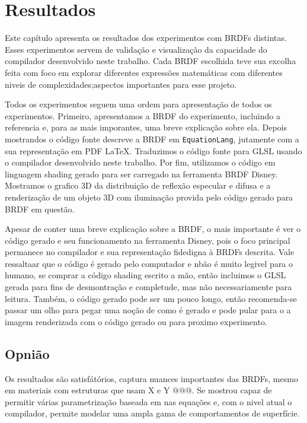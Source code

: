 \chapter{Resultados}
\label{chapter.resultados}


Este capítulo apresenta os resultados dos experimentos com BRDFs distintas. Esses experimentos servem de validação e visualização da capacidade do compilador desenvolvido neste trabalho. Cada BRDF escolhida teve sua excolha feita com foco em explorar diferentes expressões matemáticas com diferentes niveis de complexidades;aspectos importantes para esse projeto.

Todos os experimentos seguem uma ordem para apresentação de todos os experimentos. Primeiro, apresentamos a BRDF do experimento, incluindo a referencia e, para as mais imporantes, uma breve explicação sobre ela. Depois mostrandos o código fonte descreve a BRDF em \texttt{EquationLang}, jutamente com a sua representação em PDF \LaTeX. Traduzimos o código fonte para GLSL usando o compilador desenvolvido neste trabalho. Por fim, utilizamos o código em linguagem shading gerado para ser carregado na ferramenta BRDF Disney. Mostramos o grafico 3D da distribuição de reflexão especular e difusa e a renderização de um objeto 3D com iluminação provida pelo código gerado para BRDF em questão.

Apesar de conter uma breve explicação sobre a BRDF, o mais importante é ver o código gerado e seu funcionamento na ferramenta Disney, pois o foco principal permanece no compilador e sua representação fidedigna à BRDFs descrita.  Vale ressaltaar que o código é gerado pelo computador e nbão é muito legivel para o humano, se comprar a código shading escrito a mão, então incluimos o GLSL gerada para fins de desmontração e completude, mas não necessariamente para leitura. Também, o código gerado pode ser um pouco longo, então recomenda-se passar um olho para pegar uma noção de como é gerado e pode pular para o a imagem renderizada com o código gerado ou para proximo experimento.

\section{Opnião}
Os resultados são satisfátórios, captura nuances importantes das BRDFs, mesmo em materiais com estruturas que usam X e Y @@@. Se mostrou capaz de permitir várias parametrização baseada em nas equações e, com o nivel atual o compilador, permite modelar uma ampla gama de comportamentos de superfície.
